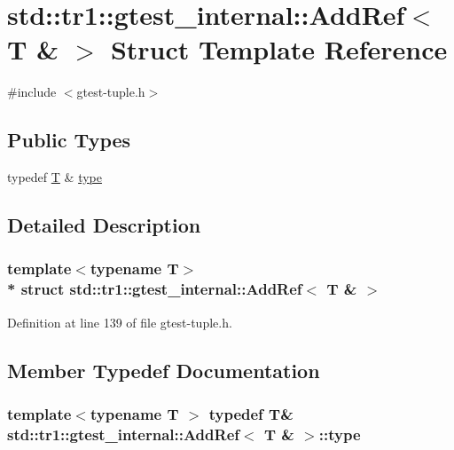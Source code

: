 \hypertarget{structstd_1_1tr1_1_1gtest__internal_1_1_add_ref_3_01_t_01_6_01_4}{}\section{std\+:\+:tr1\+:\+:gtest\+\_\+internal\+:\+:Add\+Ref$<$ T \& $>$ Struct Template Reference}
\label{structstd_1_1tr1_1_1gtest__internal_1_1_add_ref_3_01_t_01_6_01_4}


{\ttfamily \#include $<$gtest-\/tuple.\+h$>$}

\subsection*{Public Types}
\begin{DoxyCompactItemize}
\item 
typedef \hyperlink{functions__7_8js_adf1f3edb9115acb0a1e04209b7a9937b}{T} \& \hyperlink{structstd_1_1tr1_1_1gtest__internal_1_1_add_ref_3_01_t_01_6_01_4_a9cb3b0992c2a9e7df42d01fb64c2dc88}{type}
\end{DoxyCompactItemize}


\subsection{Detailed Description}
\subsubsection*{template$<$typename T$>$\\*
struct std\+::tr1\+::gtest\+\_\+internal\+::\+Add\+Ref$<$ T \& $>$}



Definition at line 139 of file gtest-\/tuple.\+h.



\subsection{Member Typedef Documentation}
\subsubsection[{\texorpdfstring{type}{type}}]{\setlength{\rightskip}{0pt plus 5cm}template$<$typename T $>$ typedef {\bf T}\& {\bf std\+::tr1\+::gtest\+\_\+internal\+::\+Add\+Ref}$<$ {\bf T} \& $>$\+::{\bf type}}\hypertarget{structstd_1_1tr1_1_1gtest__internal_1_1_add_ref_3_01_t_01_6_01_4_a9cb3b0992c2a9e7df42d01fb64c2dc88}{}\label{structstd_1_1tr1_1_1gtest__internal_1_1_add_ref_3_01_t_01_6_01_4_a9cb3b0992c2a9e7df42d01fb64c2dc88}


